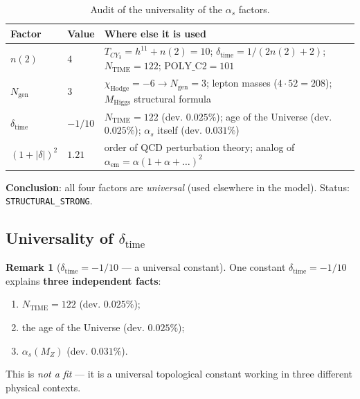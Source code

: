 \documentclass[11pt,a4paper]{article}
\newcommand{\CY}{\ensuremath{CY_3}}
\newcommand{\Ngen}{\ensuremath{N_{\text{gen}}}}
\theoremstyle{definition}
\newtheorem{remark}[theorem]{Remark}
\begin{document}
\begin{table}[ht]
\centering
\caption{Audit of the universality of the \texorpdfstring{$\alpha_s$}{\_s} factors.}
\label{tab:alphas-audit}
\begin{tabular}{p{2.5cm}p{2cm}p{7cm}}
\toprule
Factor & Value & Where else it is used \\
\midrule
$n(2)$ & $4$ &
    $T_{\CY} = h^{11} + n(2) = 10$;
    $\delta_{\text{time}} = 1/(2n(2)+2)$;
    $N_{\text{TIME}} = 122$;
    $\text{POLY\_C2} = 101$ \\[0.3em]
$\Ngen$ & $3$ &
    $\chi_{\text{Hodge}} = -6 \to \Ngen = 3$;
    lepton masses ($4 \cdot 52 = 208$);
    $M_{\text{Higgs}}$ structural formula \\[0.3em]
$\delta_{\text{time}}$ & $-1/10$ &
    $N_{\text{TIME}} = 122$ (dev. $0.025\%$);
    age of the Universe (dev. $0.025\%$);
    $\alpha_s$ itself (dev. $0.031\%$) \\[0.3em]
$(1+|\delta|)^2$ & $1.21$ &
    order of QCD perturbation theory;
    analog of $\alpha_{\text{em}} = \alpha(1 + \alpha + \ldots)^2$ \\
\bottomrule
\end{tabular}
\end{table}

\medskip\noindent
\textbf{Conclusion}: all four factors are \emph{universal}
(used elsewhere in the model). Status:
\texttt{STRUCTURAL\_STRONG}.

\subsection{Universality of \texorpdfstring{$\delta_{\text{time}}$}{delta\_time}}
\label{subsec:alphas-delta-time}

\begin{remark}[$\delta_{\text{time}} = -1/10$ --- a universal constant]
\label{rem:delta-time-universal}
One constant $\delta_{\text{time}} = -1/10$ explains
\textbf{three independent facts}:
\begin{enumerate}
    \item $N_{\text{TIME}} = 122$ (dev. $0.025\%$);
    \item the age of the Universe (dev. $0.025\%$);
    \item $\alpha_s(M_Z)$ (dev. $0.031\%$).
\end{enumerate}
This is \emph{not a fit} --- it is a universal topological
constant working in three different physical contexts.
\end{remark}
\end{document}
